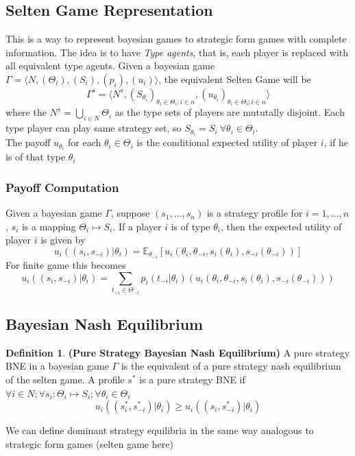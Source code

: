 \documentclass{article}
\theoremstyle{definition}
\newtheorem{defn}{Definition}[section]
\begin{document}
\subsection{Selten Game Representation}
This is a way to represent bayesian games to strategic form games with complete information. The idea is to have \textit{Type agents}, that is, each player is replaced with all equivalent type agents. Given a bayesian game $\Gamma = \langle N,(\Theta_i), (S_i), (p_i), (u_i)\rangle$, the equivalent Selten Game will be $$\Gamma^s = \langle N^s, (S_{\theta_i})_{\theta_i\in \Theta_i; i\in n}, (u_{\theta_i})_{\theta_i\in \Theta_i; i\in n}\rangle$$ where the  $N^s = \bigcup_{i\in N} \Theta_i$ as the type sets of players are mututally disjoint. Each type player can play same strategy set, so $S_{\theta_i} = S_i ~\forall \theta_i\in \Theta_i$.\\
The payoff $u_{\theta_i}$ for each $\theta_i \in \Theta_i$ is the conditional expected utility of player $i$, if he is of that type $\theta_i$
\subsubsection{Payoff Computation}
Given a bayesian game $\Gamma$, suppose $(s_1,\dots,s_n)$ is a strategy profile for $i=1,\dots,n$, $s_i$ is a mapping $\Theta_i \mapsto S_i$. If a player $i$ is of type $\theta_i$, then the expected utility of player $i$ is given by $$u_i((s_i,s_{-i})\vert \theta_i) = \mathbb{E}_{\theta_{-i}}[u_i(\theta_i,\theta_{-i}, s_i(\theta_i), s_{-i}(\theta_{-i}))]$$ For finite game this becomes 
$$u_i((s_i,s_{-i})\vert \theta_i) = \sum_{t_{-i}\in \Theta_{-i}}p_i(t_{-i}\vert\theta_i)(u_i(\theta_i,\theta_{-i}, s_i(\theta_i), s_{-i}(\theta_{-i})))$$
\subsection{Bayesian Nash Equilibrium}
\begin{defn}
\textbf{(Pure Strategy Bayesian Nash Equilibrium)} A pure strategy BNE in a bayesian game $\Gamma$ is the equivalent of a pure strategy nash equilibrium of the selten game. A profile $s^*$ is a pure strategy BNE if $\forall i\in N;\forall s_i:\Theta_i\mapsto S_i;\forall \theta_i\in \Theta_i$ $$u_i((s_i^*,s_{-i}^*)\vert \theta_i)\geq u_i((s_i,s_{-i}^*)\vert \theta_i)$$
\end{defn}
We can define dominant strategy equilibria in the same way analogous to strategic form games (selten game here)
\end{document}
